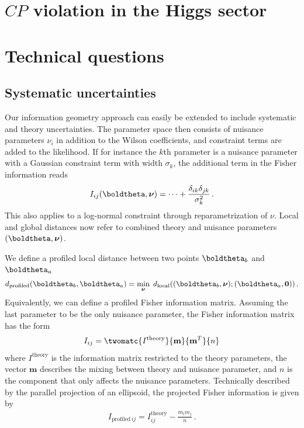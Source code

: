 \section{$CP$ violation in the Higgs sector}
\label{sec:information_CPV}


\section{Technical questions}
\label{sec:information_extensions}

\subsection{Systematic uncertainties}

Our information geometry approach can easily be extended to include
systematic and theory uncertainties. The parameter space then consists
of nuisance parameters $\nu_i$ in addition to the Wilson coefficients,
and constraint terms are added to the likelihood. If for instance the
$k$th parameter is a nuisance parameter with a Gaussian constraint
term with width $\sigma_k$, the additional term in the Fisher
information reads
%
\begin{align}
  I_{ij} (\boldtheta,\boldsymbol{\nu}) = \dots + \frac {\delta_{ik} \delta_{jk}} {\sigma_k^2} \,.
\end{align} 
%
This also applies to a log-normal constraint through reparametrization
of $\nu$.  Local and global distances now refer to combined theory and
nuisance parameters $(\boldtheta,\boldsymbol{\nu})$.

We define a profiled local distance between two points $\boldtheta_b$ and
$\boldtheta_a$
%
\begin{align}
  d_{\text{profiled}} (\boldtheta_b, \boldtheta_a)
  = \min_{\boldsymbol{\nu}}   \; d_{\text{local}}( (\boldtheta_b,\boldsymbol{\nu}) ;
  (\boldtheta_a , \mathbf{0} ) ) \,.
\end{align}
%
Equivalently, we can define a profiled Fisher information
matrix. Assuming the last parameter to be the only nuisance parameter,
the Fisher information matrix has the form
%
\begin{align}
  I_{ij} = \twomatc {I^{\text{theory}}} {\mathbf{m}} {\mathbf{m}^T} {n}
\end{align}
%
where $I^{\text{theory}}$ is the information matrix restricted to the theory
parameters, the vector $\mathbf{m}$ describes the mixing between
theory and nuisance parameter, and $n$ is the component that only
affects the nuisance parameters. Technically described by the parallel
projection of an ellipsoid, the projected Fisher information is given
by
%
\begin{align}
  I_{\text{profiled} \, ij} = I^{\text{theory}}_{ij} - \frac {m_i m_j} {n} \,.
\end{align}
\bigskip

